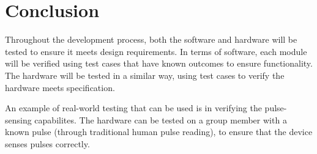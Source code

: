 \section{Conclusion}

Throughout the development process, both the software and hardware will be tested to ensure it meets design requirements. In terms of software, each module will be verified using test cases that have known outcomes to ensure functionality. The hardware will be tested in a similar way, using test cases to verify the hardware meets specification.

An example of real-world testing that can be used is in verifying the pulse-sensing capabilites. The hardware can be tested on a group member with a known pulse (through traditional human pulse reading), to ensure that the device senses pulses correctly.
